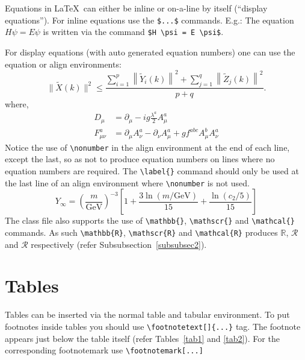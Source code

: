 \documentclass[pdflatex,sn-mathphys-num]{sn-jnl}%
\theoremstyle{thmstyleone}%
\theoremstyle{thmstyletwo}%
\theoremstyle{thmstylethree}%
\begin{document}
Equations in \LaTeX\ can either be inline or on-a-line by itself (``display equations''). For
inline equations use the \verb+$...$+ commands. E.g.: The equation
$H\psi = E \psi$ is written via the command \verb+$H \psi = E \psi$+.

For display equations (with auto generated equation numbers)
one can use the equation or align environments:
\begin{equation}
\|\tilde{X}(k)\|^2 \leq\frac{\sum\limits_{i=1}^{p}\left\|\tilde{Y}_i(k)\right\|^2+\sum\limits_{j=1}^{q}\left\|\tilde{Z}_j(k)\right\|^2 }{p+q}.\label{eq1}
\end{equation}
where,
\begin{align}
D_\mu &=  \partial_\mu - ig \frac{\lambda^a}{2} A^a_\mu \nonumber \\
F^a_{\mu\nu} &= \partial_\mu A^a_\nu - \partial_\nu A^a_\mu + g f^{abc} A^b_\mu A^a_\nu \label{eq2}
\end{align}
Notice the use of \verb+\nonumber+ in the align environment at the end
of each line, except the last, so as not to produce equation numbers on
lines where no equation numbers are required. The \verb+\label{}+ command
should only be used at the last line of an align environment where
\verb+\nonumber+ is not used.
\begin{equation}
Y_\infty = \left( \frac{m}{\textrm{GeV}} \right)^{-3}
    \left[ 1 + \frac{3 \ln(m/\textrm{GeV})}{15}
    + \frac{\ln(c_2/5)}{15} \right]
\end{equation}
The class file also supports the use of \verb+\mathbb{}+, \verb+\mathscr{}+ and
\verb+\mathcal{}+ commands. As such \verb+\mathbb{R}+, \verb+\mathscr{R}+
and \verb+\mathcal{R}+ produces $\mathbb{R}$, $\mathscr{R}$ and $\mathcal{R}$
respectively (refer Subsubsection~\ref{subsubsec2}).

\section{Tables}\label{sec5}

Tables can be inserted via the normal table and tabular environment. To put
footnotes inside tables you should use \verb+\footnotetext[]{...}+ tag.
The footnote appears just below the table itself (refer Tables~\ref{tab1} and \ref{tab2}). 
For the corresponding footnotemark use \verb+\footnotemark[...]+
\end{document}
